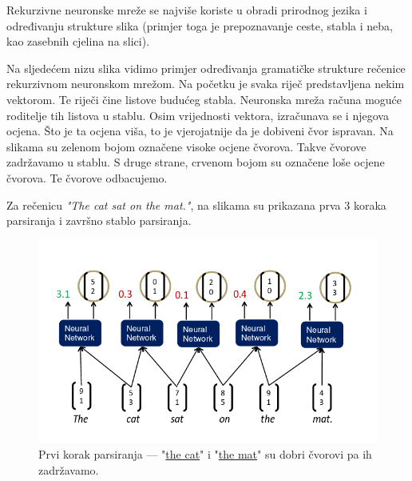 \documentclass[a4paper,twoside,12pt]{memoir} %
\newcommand{\ti}[1]{\textit{#1\/}}
\begin{document}
	Rekurzivne neuronske mreže se najviše koriste u obradi prirodnog jezika i od\-re\-đi\-va\-nju strukture slika (primjer toga je prepoznavanje ceste, stabla i neba, kao zasebnih cjelina na slici).

	\bigskip

	Na sljedećem nizu slika vidimo primjer određivanja gramatičke strukture re\-če\-ni\-ce rekurzivnom neuronskom mrežom. Na početku je svaka riječ predstavljena nekim vektorom. Te riječi čine listove budućeg stabla. Neuronska mreža računa moguće roditelje tih listova u stablu. Osim vrijednosti vektora, izračunava se i njegova ocjena. Što je ta ocjena viša, to je vjerojatnije da je dobiveni čvor ispravan. Na slikama su zelenom bojom označene visoke ocjene čvorova. Takve čvorove zadržavamo u stablu. S druge strane, crvenom bojom su označene loše ocjene čvorova. Te čvorove odbacujemo.

	Za rečenicu \ti{"The cat sat on the mat."}, na slikama su prikazana prva $3$ koraka parsiranja i završno stablo parsiranja.

	\begin{figure}[H]
		\centering
		\vspace*{-20pt}
		\includegraphics[scale = 0.70]{recursive_parse_1.png}

		\vspace*{-12pt}
		\caption{Prvi korak parsiranja --- "\underline{the cat}" i "\underline{the mat}" su dobri čvorovi pa ih zadržavamo.}
	\end{figure}
\end{document}
